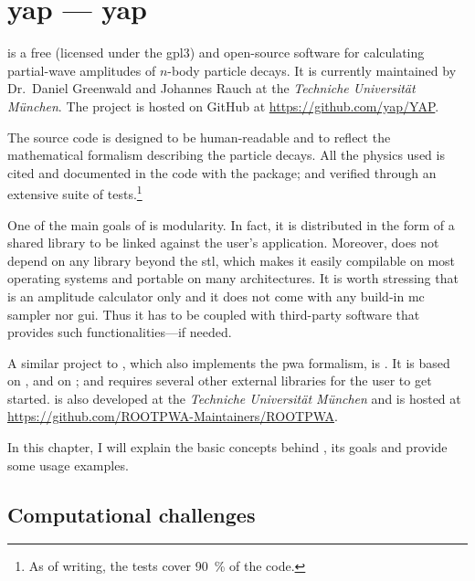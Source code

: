 \chapter{\texorpdfstring{\acs{yap} --- \acl{yap}}{YAP - Yet Another PWA Toolkit}}
\label{chap:yap}

     is a free (licensed under the \acs{gpl3}) and open-source \cpp[11] software for calculating partial-wave amplitudes of $n$-body particle decays.
    It is currently maintained by Dr.~Daniel Greenwald and Johannes Rauch at the \textsl{Techniche Universit\"at M\"unchen}.
    The project is hosted on \textsf{GitHub} at \url{https://github.com/yap/YAP}.


    The source code is designed to be human-readable and to reflect the mathematical formalism describing the particle decays.
    All the physics used is cited and documented in the code with the  package; and verified through an extensive suite of tests.\footnote{As of writing, the tests cover \SI{90}{\percent} of the code.}


    One of the main goals of  is modularity.
    In fact, it is distributed in the form of a shared library to be linked against the user's application.
    Moreover,  does not depend on any library beyond the \cpp{} \ac{stl}, which makes it easily compilable on most operating systems and portable on many architectures.
    It is worth stressing that  is an amplitude calculator only and it does not come with any build-in \ac{mc} sampler nor \ac{gui}.
    Thus it has to be coupled with third-party software that provides such functionalities---if needed.


    A similar project to , which also implements the \ac{pwa} formalism, is {\footnotesize{}}.
    It is based on \ROOT{}, and on ; and requires several other external libraries for the user to get started.
    {\footnotesize{}} is also developed at the \textsl{Techniche Universit\"at M\"unchen} and is hosted at \url{https://github.com/ROOTPWA-Maintainers/ROOTPWA}.


    In this chapter, I will explain the basic concepts behind , its goals and provide some usage examples.


    \section{Computational challenges}

